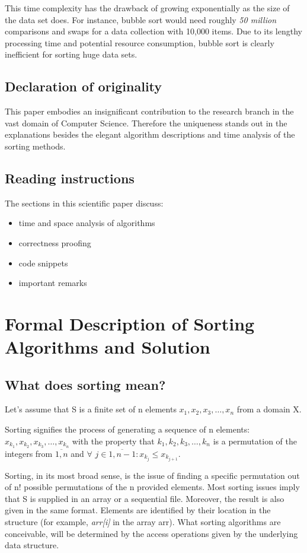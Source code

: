 \documentclass[11pt, letter paper]{article}
\begin{document}
    This time complexity has the drawback of growing exponentially as the size of the data set does. For instance, bubble sort would need roughly \emph{50 million} comparisons and swaps for a data collection with 10,000 items. Due to its lengthy processing time and potential resource consumption, bubble sort is clearly inefficient for sorting huge data sets.

    \subsection{Declaration of originality}
    This paper embodies an insignificant contribution to the research branch in the vast domain of Computer Science. Therefore the uniqueness stands out in the explanations besides the elegant algorithm descriptions and time analysis of the sorting methods.

    \subsection{Reading instructions}
    The sections in this scientific paper discuss:
    \begin{itemize}
        \item time and space analysis of algorithms
        \item correctness proofing
        \item code snippets
        \item important remarks
    \end{itemize}

    \section{Formal Description of Sorting Algorithms and Solution}
    \subsection{What does sorting mean?}
    Let’s assume that S is a finite set of n elements $x_1,x_2,x_3,\dotsc, x_n$ from a domain X.
    
    Sorting signifies the process of generating a sequence of n elements: $x_{k_1}, x_{k_2}, x_{k_3}, \dotsc, x_{k_n}$ with the property that $k_1, k_2, k_3,\dotsc, k_n$ is a permutation of the integers from $\overline{1,n}$ and $\forall$ $j \in \overline{1, n - 1}: x_{k_j} \leq x_{k_{j+1}}$.

    Sorting, in its most broad sense, is the issue of finding a specific permutation out of n! possible permutations of the n provided elements.
    Most sorting issues imply that S is supplied in an array or a sequential file. Moreover, the result is also given in the same format. Elements are identified by their location in the structure (for example, \emph{arr[i]} in the array arr). What sorting algorithms are conceivable, will be determined by the access operations given by the underlying data structure.
\end{document}

